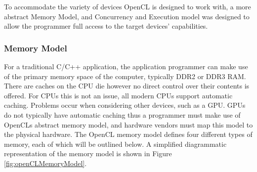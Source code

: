 To accommodate the variety of devices OpenCL is designed to work with, a more
abstract Memory Model, and Concurrency and Execution model was designed to allow
the programmer full access to the target devices' capabilities.

\subsubsection{Memory Model}

For a traditional C/C++ application, the application programmer can make use of
the primary memory space of the computer, typically DDR2 or DDR3 RAM. There are
caches on the CPU die however no direct control over their contents is offered.
For CPUs this is not an issue, all modern CPUs support automatic caching.
Problems occur when considering other devices, such as a GPU. GPUs do not
typically have automatic caching thus a programmer must make use of OpenCLs
abstract memory model, and hardware vendors must map this model to the physical
hardware. The OpenCL memory model defines four different types of memory, each
of which will be outlined below. A simplified diagrammatic representation of the
memory model is shown in Figure \ref{fig:openCLMemoryModel}.

